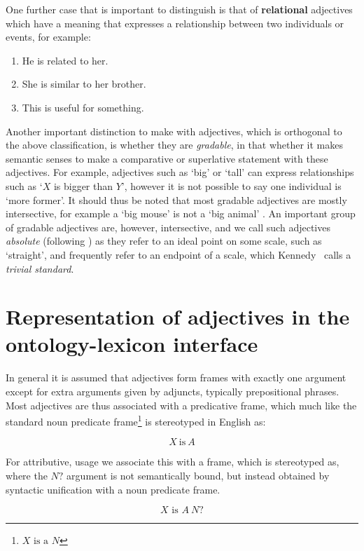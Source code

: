 \documentclass[11pt]{article}
\begin{document}
One further case that is important to distinguish is that of \textbf{relational} adjectives which have a meaning 
that expresses a relationship between two individuals or events, for example:

\begin{enumerate}[resume]
\item He is related to her.
\item She is similar to her brother. 
\item This is useful for something. 
\end{enumerate}

Another important distinction to make with adjectives, which is orthogonal to the above classification, 
is whether they are \emph{gradable}, in that whether it makes semantic senses to make a comparative 
or superlative statement with these adjectives. For example, adjectives such as 
`big' or `tall' can express relationships such as `$X$ is bigger than $Y$', 
however it is not possible to say one individual is `more former'. It should thus be noted that most gradable adjectives are mostly intersective,
for example a `big mouse' is not a `big animal' \cite{morzycki2013modification}.
An important group of gradable adjectives are, however, intersective, and we call 
such adjectives \emph{absolute} (following \cite{rusiecki1985adjectives}) as they 
refer to an ideal point on some scale, such as `straight', and frequently refer
to an endpoint of a scale, which Kennedy~ calls
a \emph{trivial standard}.

\section{Representation of adjectives in the ontology-lexicon interface}

In general it is assumed that adjectives form frames with exactly one argument 
except for extra arguments given by adjuncts, typically prepositional phrases. 
Most adjectives are thus associated with a predicative frame, which much
like the standard noun predicate frame\footnote{$X\text{ is a }N$} is stereotyped in English as:

$$X\mathrm{~is~}A$$

For attributive, usage we associate this with a frame, which is stereotyped as,
where the $N?$ argument is not semantically bound, but instead obtained by
syntactic unification with a noun predicate frame.

$$X\text{ is }A~N?$$
\end{document}
